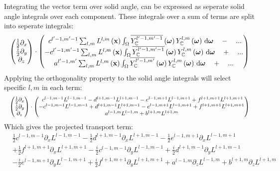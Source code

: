 Integrating the vector term over solid angle, can be expressed as seperate solid angle integrals over each component. These integrals over a sum of terms are split into seperate integrals:
\begin{align*}
\begin{pmatrix}
\frac{1}{2}\partial_x\\
\frac{i}{2}\partial_y\\
\partial_z
\end{pmatrix}
\cdot
\begin{pmatrix}
\ c^{l'-1, m'-1}\sum_{l,m}{L^{l,m}\left(\boldsymbol{\mathbf{x}}\right )\int_\Omega{\overline{Y_{\mathbb{C}}^{l'-1,m'-1}}\left(\boldsymbol{\mathbf{\omega}}\right)Y_{\mathbb{C}}^{l,m}\left(\boldsymbol{\mathbf{\omega}}\right)\,\mathrm{d}\boldsymbol{\mathbf{\omega}}}} \quad - \quad ...\\
-c^{l'-1, m'-1}\sum_{l,m}{L^{l,m}\left(\boldsymbol{\mathbf{x}}\right )\int_\Omega{\overline{Y_{\mathbb{C}}^{l'-1,m'-1}}\left(\boldsymbol{\mathbf{\omega}}\right)Y_{\mathbb{C}}^{l,m}\left(\boldsymbol{\mathbf{\omega}}\right)\,\mathrm{d}\boldsymbol{\mathbf{\omega}}}} \quad + \quad ... \\
a^{l'-1, m'}\sum_{l,m}{L^{l,m}\left(\boldsymbol{\mathbf{x}}\right )\int_\Omega{\overline{Y_{\mathbb{C}}^{l'-1,m'}}\left(\boldsymbol{\mathbf{\omega}}\right)Y_{\mathbb{C}}^{l,m}\left(\boldsymbol{\mathbf{\omega}}\right)\,\mathrm{d}\boldsymbol{\mathbf{\omega}}}} \quad + \quad ...
\end{pmatrix}
\end{align*}
Applying the orthogonality property to the solid angle integrals will select specific $l,m$ in each term:
\begin{equation*}
\resizebox{1.0\hsize}{!}{$
\begin{pmatrix}
\frac{1}{2}\partial_x\\
\frac{i}{2}\partial_y\\
\partial_z
\end{pmatrix}
\cdot
\begin{pmatrix}
\ c^{l-1, m-1}L^{l-1,m-1} - d^{l+1, m-1}L^{l+1,m-1} - e^{l-1, m+1}L^{l-1,m+1} + f^{l+1, m+1}L^{l+1,m+1}\\
-c^{l-1, m-1}L^{l-1,m-1} + d^{l+1, m-1}L^{l+1,m-1} - e^{l-1, m+1}L^{l-1,m+1} + f^{l+1, m+1}L^{l+1,m+1} \\
a^{l-1, m}L^{l-1,m}+b^{l+1, m}L^{l+1,m}
\end{pmatrix}
$}
\end{equation*}
Which gives the projected transport term:
\begin{align}
&
\frac{1}{2}c^{l-1, m-1}\partial_x L^{l-1,m-1}
-\frac{1}{2}d^{l+1, m-1}\partial_x L^{l+1,m-1}
-\frac{1}{2}e^{l-1, m+1}\partial_x L^{l-1,m+1}
\nonumber
\\
&
+\frac{1}{2}f^{l+1, m+1}\partial_x L^{l+1,m+1}
-\frac{i}{2}c^{l-1, m-1}\partial_y L^{l-1,m-1}
+\frac{i}{2}d^{l+1, m-1}\partial_y L^{l+1,m-1}
\nonumber
\\
&
-\frac{i}{2}e^{l-1, m+1}\partial_y L^{l-1,m+1}
+\frac{i}{2}f^{l+1, m+1}\partial_y L^{l+1,m+1}
+
a^{l-1, m}\partial_z L^{l-1,m}+b^{l+1, m}\partial_z L^{l+1,m}
\label{eq:sh_complex_transport}
\end{align}

